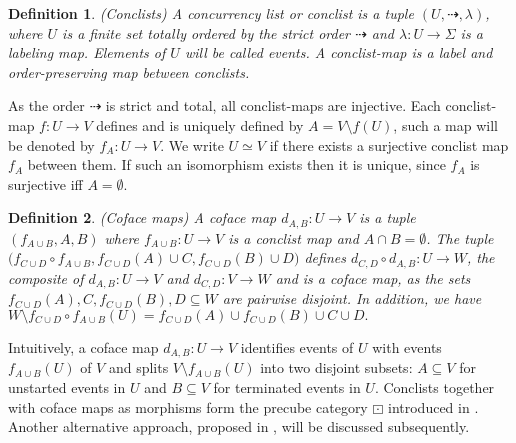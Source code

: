 \documentclass[11pt,a4paper,oldfontcommands]{memoir}
\newtheorem{definition}{Definition}
\begin{document}
\begin{definition}{(Conclists)}
A concurrency list or conclist is a tuple $(U, \dashrightarrow, \lambda)$, where $U$ is a finite set totally ordered by the strict order $\dashrightarrow$ and $\lambda: U \rightarrow \Sigma $ is a labeling map. Elements of $U$ will be called events. A conclist-map is a label and order-preserving map between conclists. 
\end{definition}
 As the order $\dashrightarrow$ is strict and total, all conclist-maps are injective. Each conclist-map $f: U \rightarrow V$ defines and is uniquely defined by $A= V \setminus f(U)$, such a map will be denoted by $f_A: U\to V$. We write $U\simeq V$ if there exists a surjective conclist map $f_A$ between them. If such an isomorphism exists then it is unique, since $f_A$ is surjective iff $A=\emptyset$.  
\begin{definition}{(Coface maps)}
    A coface map $d_{A, B}: U \to V$ is a tuple $(f_{A \cup B}, A, B)$ where $f_{A \cup B}: U \to V$ is a conclist map and $A \cap B = \emptyset$. The tuple \linebreak $\bigl(f_{C \cup D} \circ f_{A\cup B},f_{C \cup D}(A) \cup C, f_{C \cup D}(B)\cup D \bigl)$ defines $d_{C,D}\circ d_{A,B} : U \rightarrow W$, the composite of $d_{A,B}: U \rightarrow V$ and $d_{C,D}: V \rightarrow W$ and is a coface map, as the sets $f_{C \cup D}(A), C, f_{C \cup D}(B), D \subseteq W$ are pairwise disjoint. In addition, we have $W \setminus  f_{C\cup D}\circ f_{A\cup B}(U) = f_{C\cup D}(A) \cup f_{C\cup D}(B) \cup C \cup D.$ %
\end{definition} %
Intuitively, a coface map $d_{A, B}: U \rightarrow V$ identifies events of $U$ with events $f_{A \cup B}(U)$ of $V$ and splits $V \setminus f_{A \cup B}(U)$ into two disjoint subsets: $A\subseteq V$ for unstarted events in $U$ and $B\subseteq V$ for terminated events in $U$. Conclists together with coface maps as morphisms form the precube category $\boxdot$ introduced in \cite{KleeneTh}. Another alternative approach, proposed in \cite{LanguageofHDA}, will be discussed subsequently.
\end{document}
